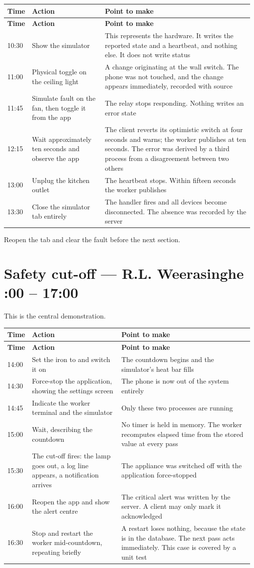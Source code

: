 \documentclass[11pt,a4paper]{article}
\makeatletter
\newenvironment{runsheet}
  {\begin{longtable}{@{}L{1.5cm}L{5.4cm}L{7.9cm}@{}}
   \toprule \textbf{Time} & \textbf{Action} & \textbf{Point to make} \\ \midrule
   \endfirsthead
   \toprule \textbf{Time} & \textbf{Action} & \textbf{Point to make} \\ \midrule
   \endhead}
  {\bottomrule\end{longtable}}
\makeatother
\begin{document}
\begin{runsheet}
10:30 & Show the simulator & This represents the hardware. It writes the reported state and a heartbeat, and nothing else. It does not write status \\
11:00 & Physical toggle on the ceiling light & A change originating at the wall switch. The phone was not touched, and the change appears immediately, recorded with source  \\
11:45 & Simulate fault on the fan, then toggle it from the app & The relay stops responding. Nothing writes an error state \\
12:15 & Wait approximately ten seconds and observe the app & The client reverts its optimistic switch at four seconds and warns; the worker publishes  at ten seconds. The error was derived by a third process from a disagreement between two others \\
13:00 & Unplug the kitchen outlet & The heartbeat stops. Within fifteen seconds the worker publishes  \\
13:30 & Close the simulator tab entirely & The  handler fires and all devices become disconnected. The absence was recorded by the server \\
\end{runsheet}

Reopen the tab and clear the fault before the next section.

\section{Safety cut-off --- R.L. Weerasinghe \hfill {}:00 -- 17:00}

This is the central demonstration.

\begin{runsheet}
14:00 & Set the iron to  and switch it on & The countdown begins and the simulator's heat bar fills \\
14:30 & Force-stop the application, showing the settings screen & The phone is now out of the system entirely \\
14:45 & Indicate the worker terminal and the simulator & Only these two processes are running \\
15:00 & Wait, describing the countdown & No timer is held in memory. The worker recomputes elapsed time from the stored  value at every pass \\
15:30 & The cut-off fires: the lamp goes out, a log line appears, a notification arrives & The appliance was switched off with the application force-stopped \\
16:00 & Reopen the app and show the alert centre & The critical alert was written by the server. A client may only mark it acknowledged \\
16:30 & Stop and restart the worker mid-countdown, repeating briefly & A restart loses nothing, because the state is in the database. The next pass acts immediately. This case is covered by a unit test \\
\end{runsheet}
\end{document}
